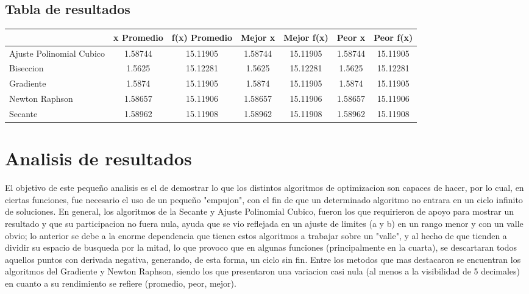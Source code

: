 \documentclass{report}
\begin{document}
            \subsection{Tabla de resultados}
            \begin{tabular}{l|c|c|c|c|c|c}
                & x Promedio & f(x) Promedio & Mejor x & Mejor f(x) & Peor x & Peor f(x)\\
                \hline
                Ajuste Polinomial Cubico & 1.58744 & 15.11905 & 1.58744 & 15.11905 & 1.58744 & 15.11905\\
                \hline
                Biseccion & 1.5625 & 15.12281 & 1.5625 & 15.12281 & 1.5625 & 15.12281\\
                \hline
                Gradiente & 1.5874 & 15.11905 & 1.5874 & 15.11905 & 1.5874 & 15.11905\\
                \hline
                Newton Raphson & 1.58657 & 15.11906 & 1.58657 & 15.11906 & 1.58657 & 15.11906\\
                \hline
                Secante & 1.58962 & 15.11908 & 1.58962 & 15.11908 & 1.58962 & 15.11908\\
                \hline
            \end{tabular}
        \pagebreak

        \section{Analisis de resultados}
        El objetivo de este pequeño analisis es el de demostrar lo que los distintos algoritmos de optimizacion son capaces de hacer,
        por lo cual, en ciertas funciones, fue necesario el uso de un pequeño "empujon", con el fin de que un determinado algoritmo
        no entrara en un ciclo infinito de soluciones.
        En general, los algoritmos de la Secante y Ajuste Polinomial Cubico, fueron los que requirieron de apoyo para mostrar un resultado
        y que su participacion no fuera nula, ayuda que se vio reflejada en un ajuste de limites (a y b) en un rango menor y con un valle obvio;
        lo anterior se debe a la enorme dependencia que tienen estos algoritmos a trabajar sobre un "valle", y al hecho de que tienden a dividir
        su espacio de busqueda por la mitad, lo que provoco que en algunas funciones (principalmente en la cuarta), se descartaran todos aquellos
        puntos con derivada negativa, generando, de esta forma, un ciclo sin fin.
        Entre los metodos que mas destacaron se encuentran los algoritmos del Gradiente y Newton Raphson, siendo los que presentaron una variacion
        casi nula (al menos a la visibilidad de 5 decimales) en cuanto a su rendimiento se refiere (promedio, peor, mejor).
\end{document}
